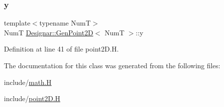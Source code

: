\subsubsection{\texorpdfstring{y}{y}}
{\footnotesize\ttfamily template$<$typename NumT$>$ \\
NumT \hyperlink{class_designar_1_1_gen_point2_d}{Designar\+::\+Gen\+Point2D}$<$ NumT $>$\+::y\hspace{0.3cm}{\ttfamily [protected]}}



Definition at line 41 of file point2\+D.\+H.



The documentation for this class was generated from the following files\+:\begin{DoxyCompactItemize}
\item 
include/\hyperlink{math_8_h}{math.\+H}\item 
include/\hyperlink{point2_d_8_h}{point2\+D.\+H}\end{DoxyCompactItemize}
